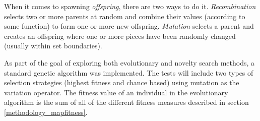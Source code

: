 When it comes to spawning \textit{offspring}, there are two ways to do it\cite[Chapter 2]{shaker2015procedural}. \textit{Recombination} selects two or more parents at random and combine their values (according to some function) to form one or more new offspring. \textit{Mutation} selects a parent and creates an offspring where one or more pieces have been randomly changed (usually within set boundaries). 

As part of the goal of exploring both evolutionary and novelty search methods, a standard genetic algorithm was implemented. The tests will include two types of selection strategies (highest fitness and chance based) using mutation as the variation operator. The fitness value of an individual in the evolutionary algorithm is the sum of all of the different fitness measures described in section \ref{methodology_mapfitness}.
